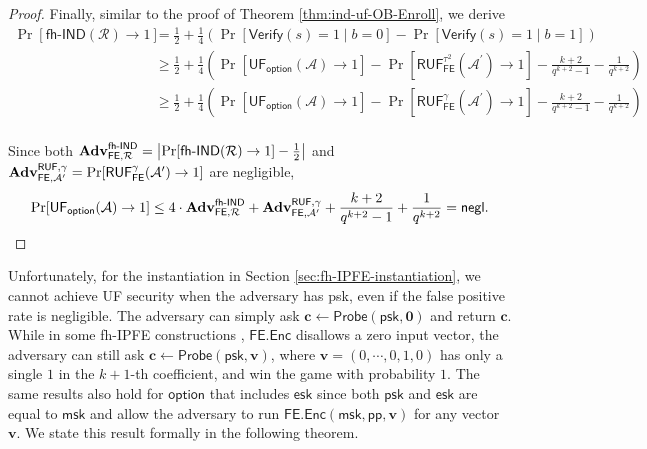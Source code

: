 \begin{proof}
Finally, similar to the proof of Theorem \ref{thm:ind-uf-OB-Enroll}, we derive
\begin{align*}
	\Pr[\textsf{fh-IND}(\mathcal{R}) \to 1]
	&= \frac{1}{2} + \frac{1}{4} \left( \Pr[\textsf{Verify}(s) = 1 \mid b = 0] - \Pr[\textsf{Verify}(s) = 1 \mid b = 1] \right) \\
	&\geq \frac{1}{2} + \frac{1}{4} \left( \Pr[\textsf{UF}_\textsf{option}(\mathcal{A}) \to 1] - \Pr[\textsf{RUF}_\textsf{FE}^{\tau^2}(\mathcal{A}^\prime) \to 1] - \frac{k+2}{q^{k+2}-1} - \frac{1}{q^{k+2}} \right) \\
	&\geq \frac{1}{2} + \frac{1}{4} \left( \Pr[\textsf{UF}_\textsf{option}(\mathcal{A}) \to 1] - \Pr[\textsf{RUF}_\textsf{FE}^{\gamma}(\mathcal{A}^\prime) \to 1] - \frac{k+2}{q^{k+2}-1} - \frac{1}{q^{k+2}} \right) \\
\end{align*}

\noindent Since both $\mathbf{Adv}_{\textsf{FE}, \mathcal{R}}^\textsf{fh-IND} = \left| \Pr[\textsf{fh-IND}(\mathcal{R}) \to 1] - \frac{1}{2} \right|$ and $\mathbf{Adv}_{\textsf{FE}, \mathcal{A}^\prime}^{\textsf{RUF}, \gamma} = \Pr[\textsf{RUF}^\gamma_{\textsf{FE}}(\mathcal{A}^\prime) \to 1 ]$ are negligible,
\[
	\Pr[\textsf{UF}_\textsf{option}(\mathcal{A}) \to 1] \leq 4 \cdot \mathbf{Adv}_{\textsf{FE}, \mathcal{R}}^\textsf{fh-IND} + \mathbf{Adv}_{\textsf{FE}, \mathcal{A}^\prime}^{\textsf{RUF}, \gamma} + \frac{k+2}{q^{k+2}-1} + \frac{1}{q^{k+2}} = \mathsf{negl}.
\]

\end{proof}

Unfortunately, for the instantiation in Section \ref{sec:fh-IPFE-instantiation}, we cannot achieve UF security when the adversary has \textsf{psk}, even if the false positive rate is negligible. The adversary can simply ask $\mathbf{c} \gets \textsf{Probe}(\textsf{psk}, \mathbf{0})$ and return $\mathbf{c}$. While in some fh-IPFE constructions \cite{cryptoeprint:2015/1255, cryptoeprint:2016/440}, $\textsf{FE.Enc}$ disallows a zero input vector, the adversary can still ask $\mathbf{c} \gets \textsf{Probe}(\textsf{psk}, \mathbf{v})$, where $\mathbf{v} = (0, \cdots, 0, 1, 0)$ has only a single $1$ in the $k+1$-th coefficient, and win the game with probability $1$. The same results also hold for $\textsf{option}$ that includes $\textsf{esk}$ since both $\textsf{psk}$ and $\textsf{esk}$ are equal to $\textsf{msk}$ and allow the adversary to run $\textsf{FE.Enc}(\textsf{msk}, \textsf{pp}, \mathbf{v})$ for any vector $\mathbf{v}$. We state this result formally in the following theorem.

